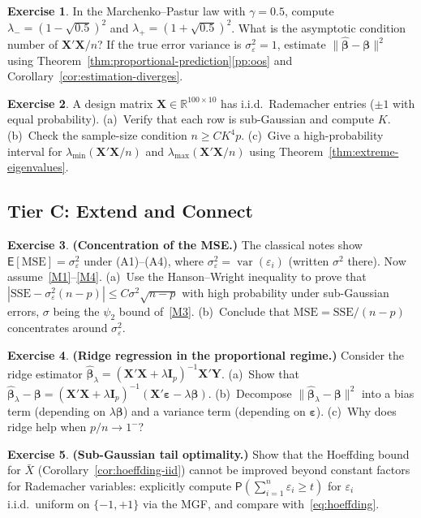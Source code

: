 \documentclass[14pt]{extarticle}
\theoremstyle{plain}
\theoremstyle{definition}
\newtheorem{exercise}{Exercise}[section]
\theoremstyle{remark}
\newcommand\expc{\mathsf{E}}
\newcommand\prb{\mathsf{P}}
\DeclareMathOperator\var{var}
\newcommand{\SSE}{\mathrm{SSE}}
\newcommand{\MSE}{\mathrm{MSE}}
\newcommand{\bX}{\mathbf{X}}
\newcommand{\bY}{\mathbf{Y}}
\def\bb{\boldsymbol{\beta}}
\newcommand{\be}{\boldsymbol{\varepsilon}}
\newcommand{\bI}{\mathbf{I}}
\newcommand{\Real}{\mathbb{R}}
\newcommand{\hbb}{\hat{\boldsymbol{\beta}}}
\begin{document}
\begin{exercise}\label{ex:mB3}
In the Marchenko--Pastur law with $\gamma = 0.5$, compute $\lambda_- = (1-\sqrt{0.5})^2$ and $\lambda_+ = (1+\sqrt{0.5})^2$. What is the asymptotic condition number of $\bX'\bX/n$? If the true error variance is $\sigma_\varepsilon^2 = 1$, estimate $\|\hbb - \bb\|^2$ using Theorem~\ref{thm:proportional-prediction}\ref{pp:oos} and Corollary~\ref{cor:estimation-diverges}.
\end{exercise}

\begin{exercise}\label{ex:mB4}
A design matrix $\bX \in \Real^{100 \times 10}$ has i.i.d.\ Rademacher entries ($\pm 1$ with equal probability). (a)~Verify that each row is sub-Gaussian and compute $K$. (b)~Check the sample-size condition $n \geqslant CK^4 p$. (c)~Give a high-probability interval for $\lambda_{\min}(\bX'\bX/n)$ and $\lambda_{\max}(\bX'\bX/n)$ using Theorem~\ref{thm:extreme-eigenvalues}.
\end{exercise}

\subsection*{Tier C: Extend and Connect}

\begin{exercise}\label{ex:mC1}
\textbf{(Concentration of the MSE.)} The classical notes show $\expc[\MSE] = \sigma_\varepsilon^2$ under (A1)--(A4), where $\sigma_\varepsilon^2 = \var(\varepsilon_i)$ (written $\sigma^2$ there). Now assume~\ref{M1}--\ref{M4}. (a)~Use the Hanson--Wright inequality to prove that $|\SSE - \sigma_\varepsilon^2(n-p)| \leqslant C\sigma^2\sqrt{n-p}$ with high probability under sub-Gaussian errors, $\sigma$ being the $\psi_2$ bound of~\ref{M3}. (b)~Conclude that $\MSE = \SSE/(n-p)$ concentrates around $\sigma_\varepsilon^2$.
\end{exercise}

\begin{exercise}\label{ex:mC2}
\textbf{(Ridge regression in the proportional regime.)} Consider the ridge estimator $\hbb_\lambda = (\bX'\bX + \lambda\bI_p)^{-1}\bX'\bY$. (a)~Show that $\hbb_\lambda - \bb = (\bX'\bX + \lambda\bI_p)^{-1}(\bX'\be - \lambda\bb)$. (b)~Decompose $\|\hbb_\lambda - \bb\|^2$ into a bias term (depending on $\lambda\bb$) and a variance term (depending on $\be$). (c)~Why does ridge help when $p/n \to 1^-$?
\end{exercise}

\begin{exercise}\label{ex:mC3}
\textbf{(Sub-Gaussian tail optimality.)} Show that the Hoeffding bound for $\bar{X}$ (Corollary~\ref{cor:hoeffding-iid}) cannot be improved beyond constant factors for Rademacher variables: explicitly compute $\prb(\sum_{i=1}^n \varepsilon_i \geqslant t)$ for $\varepsilon_i$ i.i.d.\ uniform on $\{-1, +1\}$ via the MGF, and compare with~\eqref{eq:hoeffding}.
\end{exercise}
\end{document}
